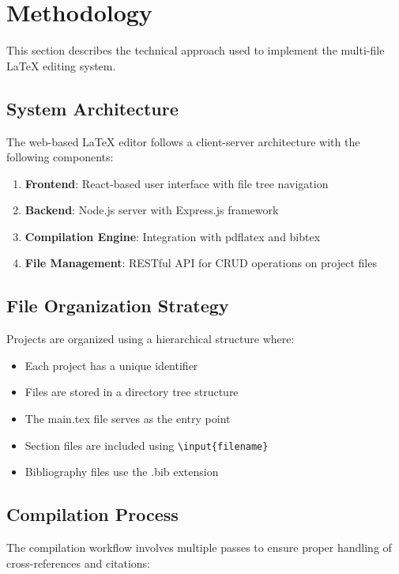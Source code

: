 \section{Methodology}

This section describes the technical approach used to implement the multi-file LaTeX editing system.

\subsection{System Architecture}

The web-based LaTeX editor follows a client-server architecture with the following components:

\begin{enumerate}
    \item \textbf{Frontend}: React-based user interface with file tree navigation
    \item \textbf{Backend}: Node.js server with Express.js framework
    \item \textbf{Compilation Engine}: Integration with pdflatex and bibtex
    \item \textbf{File Management}: RESTful API for CRUD operations on project files
\end{enumerate}

\subsection{File Organization Strategy}

Projects are organized using a hierarchical structure where:
\begin{itemize}
    \item Each project has a unique identifier
    \item Files are stored in a directory tree structure
    \item The main.tex file serves as the entry point
    \item Section files are included using \texttt{\textbackslash input\{filename\}}
    \item Bibliography files use the .bib extension
\end{itemize}

\subsection{Compilation Process}

The compilation workflow involves multiple passes to ensure proper handling of cross-references and citations:

